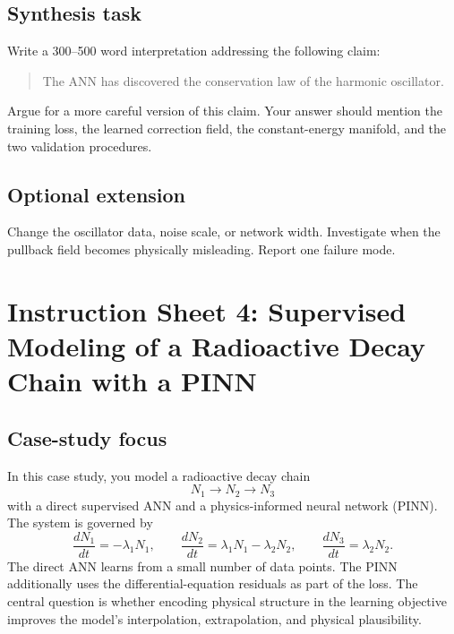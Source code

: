 \documentclass[11pt]{article}
\begin{document}
\subsection*{Synthesis task}
Write a 300--500 word interpretation addressing the following claim:

\begin{quote}
The ANN has discovered the conservation law of the harmonic oscillator.
\end{quote}

Argue for a more careful version of this claim. Your answer should mention the training loss, the learned correction field, the constant-energy manifold, and the two validation procedures.

\subsection*{Optional extension}
Change the oscillator data, noise scale, or network width. Investigate when the pullback field becomes physically misleading. Report one failure mode.

\section*{Instruction Sheet 4: Supervised Modeling of a Radioactive Decay Chain with a PINN}

\subsection*{Case-study focus}
In this case study, you model a radioactive decay chain
\[
N_1 \rightarrow N_2 \rightarrow N_3
\]
with a direct supervised ANN and a physics-informed neural network (PINN). The system is governed by
\[
\frac{dN_1}{dt}=-\lambda_1N_1,\qquad
\frac{dN_2}{dt}=\lambda_1N_1-\lambda_2N_2,\qquad
\frac{dN_3}{dt}=\lambda_2N_2.
\]
The direct ANN learns from a small number of data points. The PINN additionally uses the differential-equation residuals as part of the loss. The central question is whether encoding physical structure in the learning objective improves the model's interpolation, extrapolation, and physical plausibility.
\end{document}
